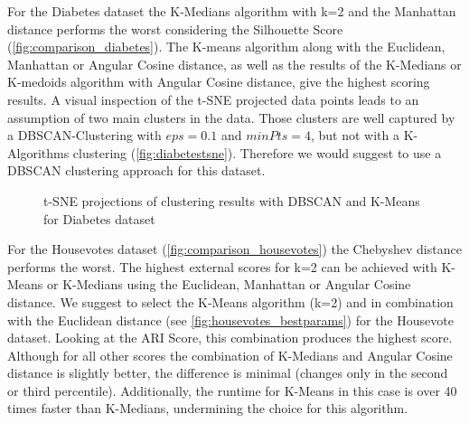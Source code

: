 For the Diabetes dataset the K-Medians algorithm with k=2 and the Manhattan distance performs the worst considering the Silhouette Score (\autoref{fig:comparison_diabetes}). The K-means algorithm along with the Euclidean, Manhattan or Angular Cosine distance, as well as the results of the K-Medians or K-medoids algorithm with Angular Cosine distance, give the highest scoring results. A visual inspection of the t-SNE projected data points leads to an assumption of two main clusters in the data. Those clusters are well captured by a DBSCAN-Clustering with $eps = 0.1$ and $minPts = 4$, but not with a K-Algorithms clustering (\autoref{fig:diabetestsne}). Therefore we would suggest to use a DBSCAN clustering approach for this dataset. 

\begin{figure}[H]
	\centering
	\caption{t-SNE projections of clustering results with DBSCAN and K-Means for Diabetes dataset}
	\label{fig:diabetestsne}
\end{figure}
 

For the Housevotes dataset (\autoref{fig:comparison_housevotes}) the Chebyshev distance performs the worst. The highest external scores for k=2 can be achieved with K-Means or K-Medians using the Euclidean, Manhattan or Angular Cosine distance. We suggest to select the K-Means algorithm (k=2) and in combination with the Euclidean distance (see \autoref{fig:housevotes_bestparams}) for the Housevote dataset. Looking at the ARI Score, this combination produces the highest score. Although for all other scores the combination of K-Medians and Angular Cosine distance is slightly better, the difference is minimal (changes only in the second or third percentile). Additionally, the runtime for K-Means in this case is over 40 times faster than K-Medians, undermining the choice for this algorithm.

